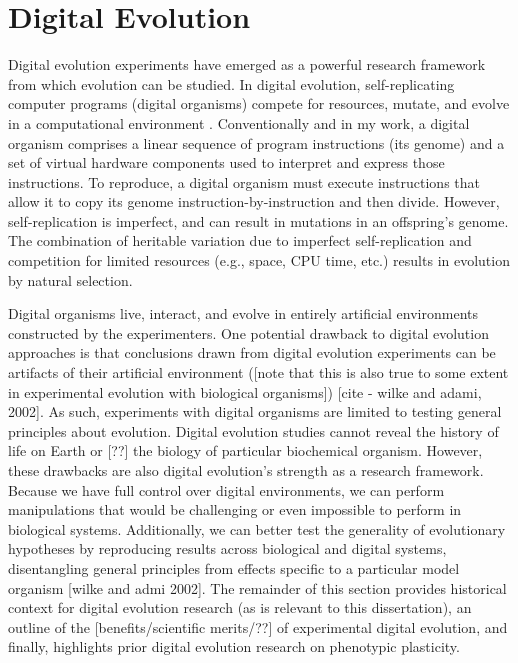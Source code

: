 \section{Digital Evolution}

Digital evolution experiments have emerged as a powerful research framework from which evolution can be studied.
In digital evolution, self-replicating computer programs (digital organisms) compete for resources, mutate, and evolve in a computational environment \citep{wilke_biology_2002}.
Conventionally and in my work, a digital organism comprises a linear sequence of program instructions (its genome) and a set of virtual hardware components used to interpret and express those instructions. 
To reproduce, a digital organism must execute instructions that allow it to copy its genome instruction-by-instruction and then divide.
However, self-replication is imperfect, and can result in mutations in an offspring's genome.
The combination of heritable variation due to imperfect self-replication and competition for limited resources (e.g., space, CPU time, etc.) results in evolution by natural selection.

Digital organisms live, interact, and evolve in entirely artificial environments constructed by the experimenters.
One potential drawback to digital evolution approaches is that conclusions drawn from digital evolution experiments can be artifacts of their artificial environment ([note that this is also true to some extent in experimental evolution with biological organisms]) [cite - wilke and adami, 2002].
As such, experiments with digital organisms are limited to testing general principles about evolution.
Digital evolution studies cannot reveal the history of life on Earth or [??] the biology of particular biochemical organism.
However, these drawbacks are also digital evolution's strength as a research framework.
Because we have full control over digital environments, we can perform manipulations that would be challenging or even impossible to perform in biological systems.
Additionally, we can better test the generality of evolutionary hypotheses by reproducing results across biological and digital systems, disentangling general principles from effects  specific to a particular model organism [wilke and admi 2002].
The remainder of this section provides historical context for digital evolution research (as is relevant to this dissertation), an outline of the [benefits/scientific merits/??] of experimental digital evolution, and finally, highlights prior digital evolution research on phenotypic plasticity.

